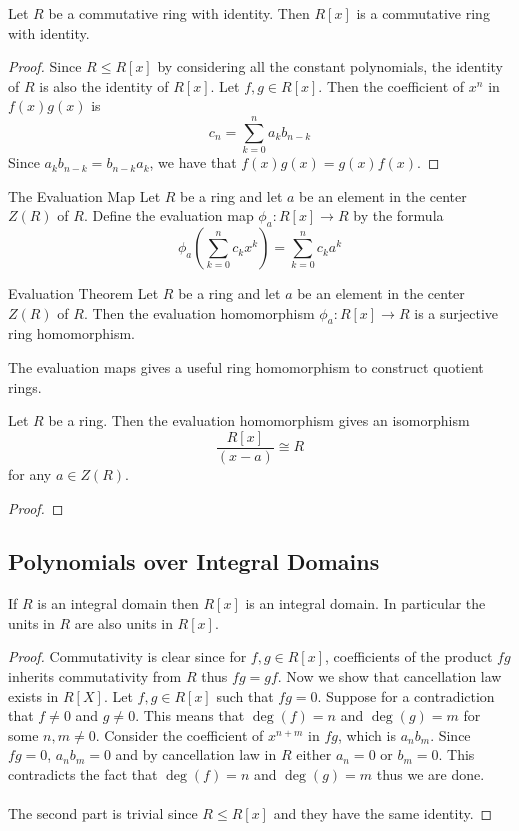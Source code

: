 \documentclass[a4paper]{article}
\begin{document}
\begin{prp}{}{} Let $R$ be a commutative ring with identity. Then $R[x]$ is a commutative ring with identity. \tcbline
\begin{proof}
Since $R\leq R[x]$ by considering all the constant polynomials, the identity of $R$ is also the identity of $R[x]$. Let $f,g\in R[x]$. Then the coefficient of $x^n$ in $f(x)g(x)$ is $$c_n=\sum_{k=0}^na_kb_{n-k}$$ Since $a_kb_{n-k}=b_{n-k}a_k$, we have that $f(x)g(x)=g(x)f(x)$. 
\end{proof}
\end{prp}

\begin{defn}{The Evaluation Map}{} Let $R$ be a ring and let $a$ be an element in the center $Z(R)$ of $R$. Define the evaluation map $\phi_a:R[x]\to R$ by the formula $$\phi_a\left(\sum_{k=0}^nc_kx^k\right)=\sum_{k=0}^nc_ka^k$$
\end{defn}

\begin{thm}{Evaluation Theorem}{} Let $R$ be a ring and let $a$ be an element in the center $Z(R)$ of $R$. Then the evaluation homomorphism $\phi_a:R[x]\to R$ is a surjective ring homomorphism. 
\end{thm}

The evaluation maps gives a useful ring homomorphism to construct quotient rings. 

\begin{lmm}{}{} Let $R$ be a ring. Then the evaluation homomorphism gives an isomorphism $$\frac{R[x]}{(x-a)}\cong R$$ for any $a\in Z(R)$.  \tcbline
\begin{proof}
\end{proof}
\end{lmm}

\subsection{Polynomials over Integral Domains}
\begin{prp}{}{} If $R$ is an integral domain then $R[x]$ is an integral domain. In particular the units in $R$ are also units in $R[x]$. \tcbline
\begin{proof}
Commutativity is clear since for $f,g\in R[x]$, coefficients of the product $fg$ inherits commutativity from $R$ thus $fg=gf$. Now we show that cancellation law exists in $R[X]$. Let $f,g\in R[x]$ such that $fg=0$. Suppose for a contradiction that $f\neq 0$ and $g\neq 0$. This means that $\deg(f)=n$ and $\deg(g)=m$ for some $n,m\neq 0$. Consider the coefficient of $x^{n+m}$ in $fg$, which is $a_nb_m$. Since $fg=0$, $a_nb_m=0$ and by cancellation law in $R$ either $a_n=0$ or $b_m=0$. This contradicts the fact that $\deg(f)=n$ and $\deg(g)=m$ thus we are done. \\~\\
The second part is trivial since $R\leq R[x]$ and they have the same identity. 
\end{proof}
\end{prp}
\end{document}
